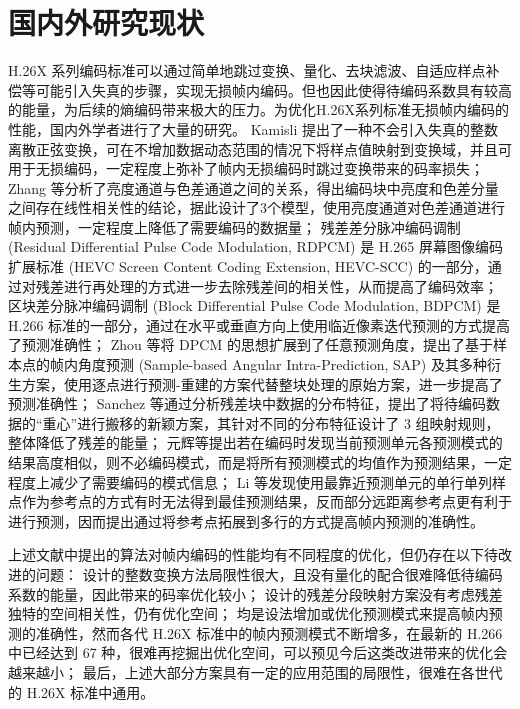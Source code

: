 \section{国内外研究现状}
H.26X 系列编码标准可以通过简单地跳过变换、量化、去块滤波、自适应样点补偿等可能引入失真的步骤，实现无损帧内编码。但也因此使得待编码系数具有较高的能量，为后续的熵编码带来极大的压力。为优化H.26X系列标准无损帧内编码的性能，国内外学者进行了大量的研究。
Kamisli 提出了一种不会引入失真的整数离散正弦变换，可在不增加数据动态范围的情况下将样点值映射到变换域，并且可用于无损编码，一定程度上弥补了帧内无损编码时跳过变换带来的码率损失；
Zhang 等分析了亮度通道与色差通道之间的关系，得出编码块中亮度和色差分量之间存在线性相关性的结论，据此设计了3个模型，使用亮度通道对色差通道进行帧内预测，一定程度上降低了需要编码的数据量；
残差差分脉冲编码调制 (Residual Differential Pulse Code Modulation, RDPCM) 是 H.265 屏幕图像编码扩展标准 (HEVC Screen Content Coding Extension, HEVC-SCC) 的一部分，通过对残差进行再处理的方式进一步去除残差间的相关性，从而提高了编码效率；
区块差分脉冲编码调制 (Block Differential Pulse Code Modulation, BDPCM) 是 H.266 标准的一部分，通过在水平或垂直方向上使用临近像素迭代预测的方式提高了预测准确性；
Zhou 等将 DPCM 的思想扩展到了任意预测角度，提出了基于样本点的帧内角度预测 (Sample-based Angular Intra-Prediction, SAP) 及其多种衍生方案，使用逐点进行预测-重建的方案代替整块处理的原始方案，进一步提高了预测准确性；
Sanchez 等通过分析残差块中数据的分布特征，提出了将待编码数据的“重心”进行搬移的新颖方案，其针对不同的分布特征设计了 3 组映射规则，整体降低了残差的能量；
元辉等提出若在编码时发现当前预测单元各预测模式的结果高度相似，则不必编码模式，而是将所有预测模式的均值作为预测结果，一定程度上减少了需要编码的模式信息；
Li 等发现使用最靠近预测单元的单行单列样点作为参考点的方式有时无法得到最佳预测结果，反而部分远距离参考点更有利于进行预测，因而提出通过将参考点拓展到多行的方式提高帧内预测的准确性。

上述文献中提出的算法对帧内编码的性能均有不同程度的优化，但仍存在以下待改进的问题：
\cite{LosslessI2ITransformTCSVT} 设计的整数变换方法局限性很大，且没有量化的配合很难降低待编码系数的能量，因此带来的码率优化较小；
\cite{pwmResidualsPiecewiseMapping,HEVCSCCOverview} 设计的残差分段映射方案没有考虑残差独特的空间相关性，仍有优化空间；
\cite{CrossComponentPredictionCCLM,SAP-SAPE,SAP-SAP1,SAP-SAPHVSWP2DTM,SAP-SAPHV,SAP-SAP,XiDianIntraPredictionH264,EfficientMultiplelinebasedIntra} 均是设法增加或优化预测模式来提高帧内预测的准确性，然而各代 H.26X 标准中的帧内预测模式不断增多，在最新的 H.266 中已经达到 67 种，很难再挖掘出优化空间，可以预见今后这类改进带来的优化会越来越小；
最后，上述大部分方案具有一定的应用范围的局限性，很难在各世代的 H.26X 标准中通用。


